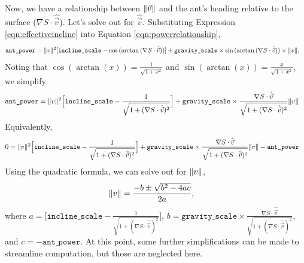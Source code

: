 \documentclass{article}
\DeclarePairedDelimiter\norm{\lVert}{\rVert}%
\begin{document}
Now, we have a relationship between $\norm{\vec{v}}$ and the ant's heading relative to the surface ($\nabla S \cdot \hat{\vec{v}}$).
Let's solve out for $\hat{\vec{v}}$.
Substituting Expression \ref{eqn:effectiveincline} into Equation \ref{eqn:powerrelationship},
\begin{align*}
\texttt{ant\_power}
&= \norm{v}^2[\texttt{incline\_scale} - \cos{(\arctan{(\nabla S \cdot \hat{\vec{v}})})}] + \texttt{gravity\_scale} \times \sin{(\arctan{(\nabla S \cdot \hat{\vec{v}})})} \times \norm{v}.
\end{align*}
Noting that $\cos{(\arctan{(x)})} = \frac{1}{\sqrt{1 + x^2}}$ and $\sin{(\arctan{(x)})} = \frac{x}{\sqrt{1 + x^2}}$, we simplify 
\begin{align*}
\texttt{ant\_power}
&= \norm{v}^2 \Big[\texttt{incline\_scale} - \frac{1}{\sqrt{1 + (\nabla S \cdot \hat{\vec{v}})^2}}\Big] + \texttt{gravity\_scale} \times \frac{\nabla S \cdot \hat{\vec{v}}}{\sqrt{1 + (\nabla S \cdot \hat{\vec{v}})^2}} \norm{v}
\end{align*}
Equivalently,
\begin{align*}
0
&= \norm{v}^2 \Big[\texttt{incline\_scale} - \frac{1}{\sqrt{1 + (\nabla S \cdot \hat{\vec{v}})^2}}\Big] + \texttt{gravity\_scale} \times \frac{\nabla S \cdot \hat{\vec{v}}}{\sqrt{1 + (\nabla S \cdot \hat{\vec{v}})^2}} \norm{v} - \texttt{ant\_power}
\end{align*}
Using the quadratic formula, we can solve out for $\norm{v}$,
\begin{align*}
\norm{v} &= \frac{-b\pm\sqrt{b^2-4ac}}{2a},
\end{align*}
where $a = \Big[\texttt{incline\_scale} - \frac{1}{\sqrt{1 + (\nabla S \cdot \hat{\vec{v}})^2}}\Big]$, $b = \texttt{gravity\_scale} \times \frac{\nabla S \cdot \hat{\vec{v}}}{\sqrt{1 + (\nabla S \cdot \hat{\vec{v}})^2}}$, and $c = - \texttt{ant\_power}$.
At this point, some further simplifications can be made to streamline computation, but those are neglected here.
\end{document}
